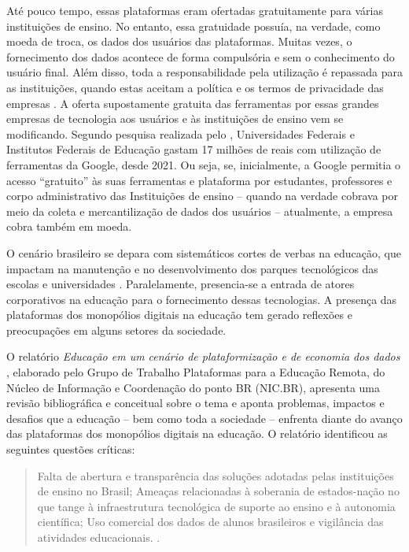 \documentclass[portuguese]{textolivre}
\begin{document}
Até pouco tempo, essas plataformas eram ofertadas gratuitamente para várias instituições de ensino. No entanto, essa gratuidade possuía, na verdade, como moeda de troca, os dados dos usuários das plataformas. Muitas vezes, o fornecimento dos dados acontece de forma compulsória e sem o conhecimento do usuário final. Além disso, toda a responsabilidade pela utilização é repassada para as instituições, quando estas aceitam a política e os termos de privacidade das empresas \cite{lima2020educaccao}. A oferta supostamente gratuita das ferramentas por essas grandes empresas de tecnologia aos usuários e às instituições de ensino vem se modificando. Segundo pesquisa realizada pelo \textcite{observario2023}, Universidades Federais e Institutos Federais de Educação gastam 17 milhões de reais com utilização de ferramentas da Google, desde 2021. Ou seja, se, inicialmente, a Google permitia o acesso “gratuito” às suas ferramentas e plataforma por estudantes, professores e corpo administrativo das Instituições de ensino – quando na verdade cobrava por meio da coleta e mercantilização de dados dos usuários – atualmente, a empresa cobra também em moeda.

O cenário brasileiro se depara com sistemáticos cortes de verbas na educação, que impactam na manutenção e no desenvolvimento dos parques tecnológicos das escolas e universidades \cite{cruz_neoliberalismo_2020}. Paralelamente, presencia-se a entrada de atores corporativos na educação para o fornecimento dessas tecnologias. A presença das plataformas dos monopólios digitais na educação tem gerado reflexões e preocupações em alguns setores da sociedade.

O relatório \emph{Educação em um cenário de plataformização e de economia dos dados} \cite{comitegestor}, elaborado pelo Grupo de Trabalho Plataformas para a Educação Remota, do Núcleo de Informação e Coordenação do ponto BR (NIC.BR), apresenta uma revisão bibliográfica e conceitual sobre o tema e aponta problemas, impactos e desafios que a educação – bem como toda a sociedade – enfrenta diante do avanço das plataformas dos monopólios digitais na educação. O relatório identificou as seguintes questões críticas:

\begin{quote}
Falta de abertura e transparência das soluções adotadas pelas instituições de ensino no Brasil; Ameaças relacionadas à soberania de estados-nação no que tange à infraestrutura tecnológica de suporte ao ensino e à autonomia científica; Uso comercial dos dados de alunos brasileiros e vigilância das atividades educacionais. \cite[p. 41]{comitegestor}.
\end{quote}
\end{document}
